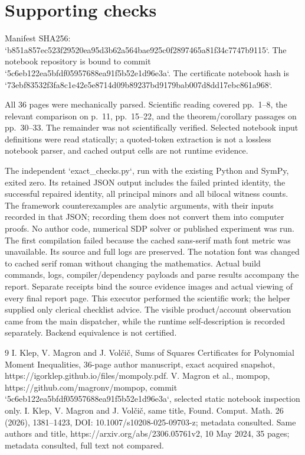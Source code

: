 \documentclass[10pt]{article}
\begin{document}
\section*{Supporting checks}
Manifest SHA256: `b851a857ec523f29520ea95d3b62a564bae925c0f2897465a81f34c7747b9115`. The notebook repository is bound to commit `5c6eb122ea5bfdf05957688ea91f5b52e1d96e3a`. The certificate notebook hash is `73ebf83532f3fa8c1e42e5e8714d09b89237bd9179bab007d8dd17ebc861a968`.\par
All 36 pages were mechanically parsed. Scientific reading covered pp. 1–8, the relevant comparison on p. 11, pp. 15–22, and the theorem/corollary passages on pp. 30–33. The remainder was not scientifically verified. Selected notebook input definitions were read statically; a quoted-token extraction is not a lossless notebook parser, and cached output cells are not runtime evidence.\par
The independent `exact\_checks.py`, run with the existing Python and SymPy, exited zero. Its retained JSON output includes the failed printed identity, the successful repaired identity, all principal minors and all bilocal witness counts. The framework counterexamples are analytic arguments, with their inputs recorded in that JSON; recording them does not convert them into computer proofs. No author code, numerical SDP solver or published experiment was run. The first compilation failed because the cached sans-serif math font metric was unavailable. Its source and full logs are preserved. The notation font was changed to cached serif roman without changing the mathematics. Actual build commands, logs, compiler/dependency payloads and parse results accompany the report. Separate receipts bind the source evidence images and actual viewing of every final report page. This executor performed the scientific work; the helper supplied only clerical checklist advice. The visible product/account observation came from the main dispatcher, while the runtime self-description is recorded separately. Backend equivalence is not certified.\par
9 I. Klep, V. Magron and J. Volčič, Sums of Squares Certificates for Polynomial Moment Inequalities, 36-page author manuscript, exact acquired snapshot, https://igorklep.github.io/files/mompoly.pdf. V. Magron et al., mompop, https://github.com/magronv/mompop, commit `5c6eb122ea5bfdf05957688ea91f5b52e1d96e3a`, selected static notebook inspection only. I. Klep, V. Magron and J. Volčič, same title, Found. Comput. Math. 26 (2026), 1381–1423, DOI: 10.1007/s10208-025-09703-z; metadata consulted. Same authors and title, https://arxiv.org/abs/2306.05761v2, 10 May 2024, 35 pages; metadata consulted, full text not compared.\par
\end{document}

